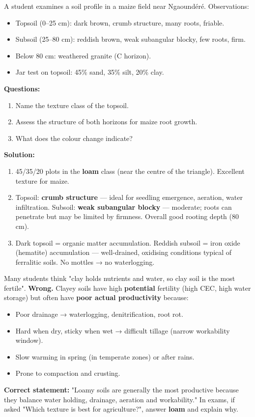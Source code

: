 \documentclass[11pt]{article}
\newcounter{popsec}
\newcounter{popsub}
\newcommand{\courssub}[1]{%
  \stepcounter{popsub}%
  \par\vspace{9pt}\noindent{\popxbold\fontsize{11.5}{13}\selectfont\color{popink}{\color{poporange}\thepopsec.\thepopsub}\hspace{6pt}#1}\par\nopagebreak\vspace{4pt}
}
\begin{document}
\begin{exoresolu}
A student examines a soil profile in a maize field near Ngaoundéré. Observations:
\begin{itemize}
\item Topsoil (0–25 cm): dark brown, crumb structure, many roots, friable.
\item Subsoil (25–80 cm): reddish brown, weak subangular blocky, few roots, firm.
\item Below 80 cm: weathered granite (C horizon).
\item Jar test on topsoil: 45\% sand, 35\% silt, 20\% clay.
\end{itemize}
\textbf{Questions:}
\begin{enumerate}
\item Name the texture class of the topsoil.
\item Assess the structure of both horizons for maize root growth.
\item What does the colour change indicate?
\end{enumerate}
\tcblower
\textbf{Solution:}
\begin{enumerate}
\item 45/35/20 plots in the \textbf{loam} class (near the centre of the triangle). Excellent texture for maize.
\item Topsoil: \textbf{crumb structure} — ideal for seedling emergence, aeration, water infiltration. Subsoil: \textbf{weak subangular blocky} — moderate; roots can penetrate but may be limited by firmness. Overall good rooting depth (80 cm).
\item Dark topsoil = organic matter accumulation. Reddish subsoil = iron oxide (hematite) accumulation — well-drained, oxidising conditions typical of ferralitic soils. No mottles → no waterlogging.
\end{enumerate}

\end{exoresolu}

\courssub{Common Mistakes and Exam Tips}

\begin{attention}
Many students think "clay holds nutrients and water, so clay soil is the most fertile". \textbf{Wrong.} Clayey soils have high \textbf{potential} fertility (high CEC, high water storage) but often have \textbf{poor actual productivity} because:
\begin{itemize}
\item Poor drainage → waterlogging, denitrification, root rot.
\item Hard when dry, sticky when wet → difficult tillage (narrow workability window).
\item Slow warming in spring (in temperate zones) or after rains.
\item Prone to compaction and crusting.
\end{itemize}
\textbf{Correct statement:} "Loamy soils are generally the most productive because they balance water holding, drainage, aeration and workability." In exams, if asked "Which texture is best for agriculture?", answer \textbf{loam} and explain why.
\end{attention}
\end{document}
